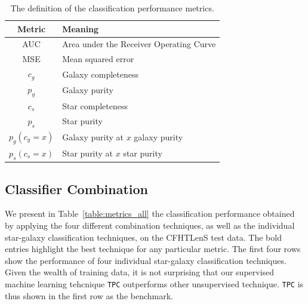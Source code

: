 \documentclass[useAMS,usenatbib]{mn2e}
\begin{document}
\begin{table}
  \caption{The definition of the classification performance metrics.}
  \centering
  \begin{tabular}{c l}
  Metric & Meaning \\
  \hline
  AUC & Area under the Receiver Operating Curve \\
  MSE & Mean squared error \\
  $c_g$ & Galaxy completeness \\
  $p_g$ & Galaxy purity \\
  $c_s$ & Star completeness \\
  $p_s$ & Star purity \\
  $p_g(c_g=x)$ & Galaxy purity at $x$ galaxy purity \\
  $p_s(c_s=x)$ & Star purity at $x$ star purity \\
  \end{tabular}
  \label{table:metrics}
\end{table}


\subsection{Classifier Combination}
  \label{section:rich_training}

\begin{table}
  \caption{A summary of the classification performance metrics
           for the four individual methods
           and the four different classification combination methods
           as applied to the CFHTLenS data,
           with no cut applied to the training data set.
           The definition of the metrics is summarized in
           Table~\ref{table:metrics}.
           The bold entries highlight the best performance values
           within each column.}
  \centering
  
  \label{table:metrics_all}
\end{table}

We present in Table~\ref{table:metrics_all}
the classification performance obtained by
applying the four different combination techniques,
as well as the individual star-galaxy classification techniques,
on the CFHTLenS test data.
The bold entries highlight the best technique for any particular metric.
The first four rows show the performance of four individual star-galaxy
classification techniques.
Given the wealth of training data, it is not surprising that 
our supervised machine learning tehcnique \texttt{TPC}
outperforms other unsupervised technique.
\texttt{TPC} is thus shown in the first row as the benchmark.
\end{document}
